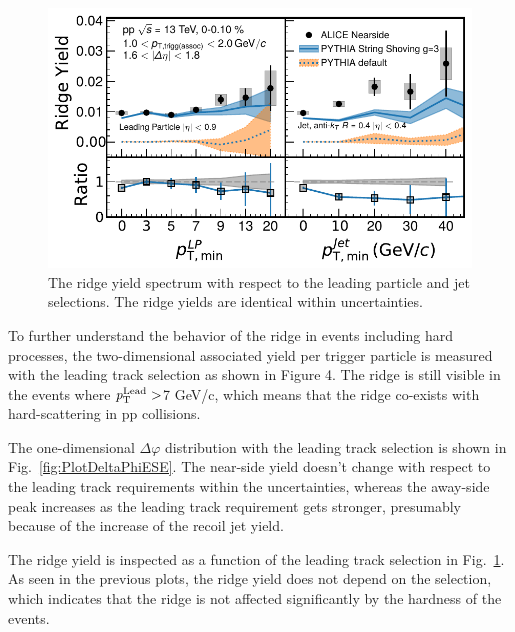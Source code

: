 \begin{figure}[h!]
	\centering
	\includegraphics[width=0.99\linewidth]{./figures/Fig6_RidgeYieldESE.pdf}
	\caption{The ridge yield spectrum with respect to the leading particle and jet selections. The ridge yields are identical within uncertainties.}
	\label{fig:RidgeYield_ESE}
\end{figure}

To further understand the behavior of the ridge in events including hard processes, the two-dimensional associated yield per trigger particle is measured with the leading track selection as shown in Figure 4. The ridge is still visible in the events where $\it{p}_{\rm{T}}^{\rm{Lead}}>$7 GeV/c, which means that the ridge co-exists with hard-scattering in pp collisions. 

The one-dimensional $\Delta\varphi$ distribution with the leading track selection is shown in Fig.~\ref{fig:PlotDeltaPhiESE}. The near-side yield doesn't change with respect to the leading track requirements within the uncertainties, whereas the away-side peak increases as the leading track requirement gets stronger, presumably because of the increase of the recoil jet yield.

The ridge yield is inspected as a function of the leading track selection in Fig.~\ref{fig:RidgeYield_ESE}. As seen in the previous plots, the ridge yield does not depend on the selection, which indicates that the ridge is not affected significantly by the hardness of the events.



